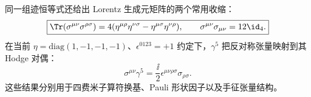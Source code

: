 同一组迹恒等式还给出 Lorentz 生成元矩阵的两个常用收缩：
\begin{equation}
 \boxed{\Tr(\sigma^{\mu\nu}\sigma^{\rho\sigma})
 =4(\eta^{\mu\rho}\eta^{\nu\sigma}-\eta^{\mu\sigma}\eta^{\nu\rho}),
 \qquad
 \sigma^{\mu\nu}\sigma_{\mu\nu}=12\id_4.}
 \label{eq:sigma-sigma-trace-r68}
\end{equation}
在当前 $\eta=\mathrm{diag}(1,-1,-1,-1)$、$\epsilon^{0123}=+1$ 约定下，$\gamma^5$ 把反对称张量映射到其 Hodge 对偶：
\begin{equation}
 \boxed{\sigma^{\mu\nu}\gamma^5
 =\frac{\ii}{2}\epsilon^{\mu\nu\rho\sigma}\sigma_{\rho\sigma}.}
 \label{eq:sigma-gamma5-dual-r68}
\end{equation}
这些结果分别用于四费米子算符换基、Pauli 形状因子以及手征张量结构。
